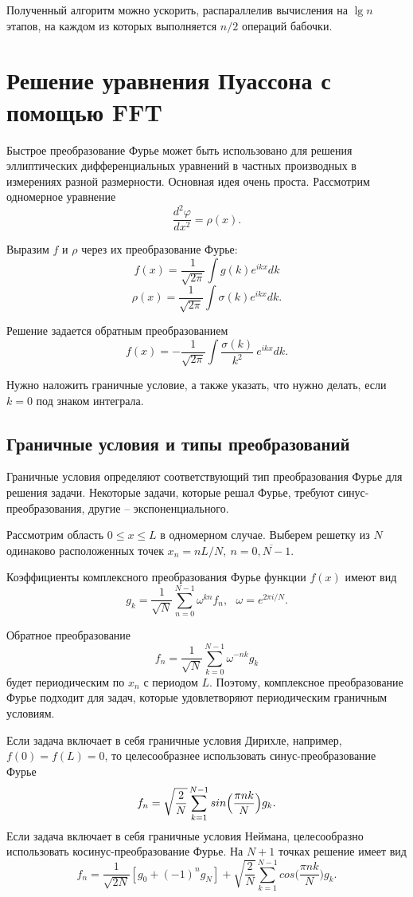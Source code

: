 \documentclass[a4paper,12pt]{article}
\theoremstyle{plain} %
\theoremstyle{definition} %
\theoremstyle{remark} %
\theoremstyle{definition}
\theoremstyle{definition}
\begin{document}
	Полученный алгоритм можно ускорить, распараллелив вычисления на $\lg n$ этапов, на каждом из которых выполняется $n/2$ операций бабочки.
	\newpage
	\section{Решение уравнения Пуассона с помощью FFT}
		Быстрое преобразование Фурье может быть использовано для решения эллиптических дифференциальных уравнений в частных производных в измерениях разной размерности. Основная идея очень проста. Рассмотрим одномерное уравнение $$\frac{d^{2}\varphi}{dx^{2}}=\rho(x).$$
		
		Выразим $f$ и $\rho$ через их преобразование Фурье:
		$$f(x)=\frac{1}{\sqrt{2\pi}} \int g(k)e^{ikx}dk$$  $$\rho(x)=\frac{1}{\sqrt{2\pi}}\int \sigma(k)e^{ikx}dk.$$
		
		Решение задается обратным преобразованием
		$$f(x)=-\frac{1}{\sqrt{2\pi}}\int\frac{\sigma(k)}{k^{2}} \ e^{ikx}dk.$$
		
		Нужно наложить граничные условие, а также указать, что нужно делать, если $k=0$ под знаком интеграла.
	\subsection{Граничные условия и типы преобразований}
		Граничные условия определяют соответствующий тип преобразования Фурье для решения задачи. Некоторые задачи, которые решал Фурье, требуют синус-преобразования, другие -- экспоненциального.
		\medskip
		
		Рассмотрим область $0\le x \le L$ в одномерном случае. Выберем решетку из $N$ одинаково расположенных точек $x_{n}=nL/N, \ n=\overline{0,N-1}.$
		\medskip
		
		Коэффициенты комплексного преобразования Фурье функции $f(x)$ имеют вид
		$$g_{k}=\frac{1}{\sqrt{N}}\sum_{n=0}^{N-1}\omega^{kn}f_{n}, \ \ \ \omega=e^{2\pi i/N}.$$
		\medskip
			
		Обратное преобразование
		$$f_{n}=\frac{1}{\sqrt{N}}\sum_{k=0}^{N-1}\omega^{-nk}g_{k}$$
		будет периодическим по $x_n$ с периодом $L$. Поэтому, комплексное преобразование Фурье подходит для задач, которые удовлетворяют периодическим граничным условиям.
		
		Если задача включает в себя граничные условия Дирихле, например, $f(0)=f(L)=0$, то целесообразнее использовать синус-преобразование Фурье
		$$f_{n}=\sqrt{\frac{2}{N}}\sum_{k=1}^{N-1}sin\Bigl(\frac{\pi nk}{N}\Bigr) g_{k}.$$
		Если задача включает в себя граничные условия Неймана, целесообразно использовать косинус-преобразование Фурье. На $N+1$ точках решение имеет вид
		$$f_{n}=\frac{1}{\sqrt{2N}}[g_{0}+(-1)^{n}g_{N}]+\sqrt{\frac{2}{N}}\sum_{k=1}^{N-1}cos\Big(\frac{\pi nk}{N}\Big)g_{k}.$$
		
\end{document}
